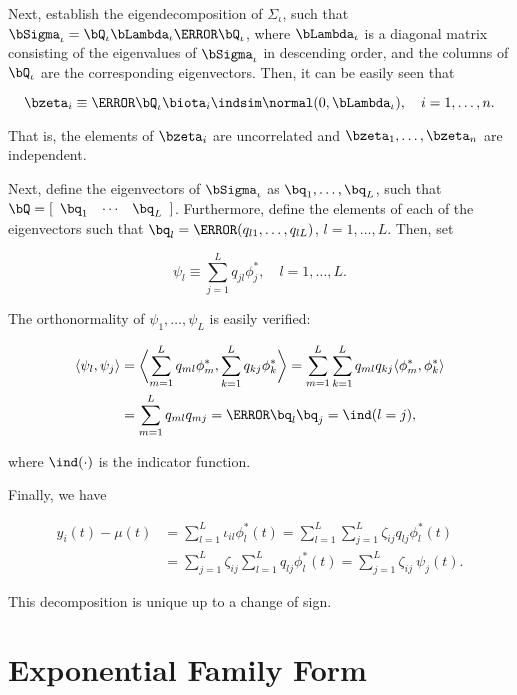 \documentclass[12pt]{article}
\theoremstyle{plain}
\theoremstyle{definition}
\theoremstyle{remark}
\begin{document}
\noindent Next, establish the eigendecomposition of $\Sigma_\iota$, such
that $\bSigma_\iota = \bQ_\iota \bLambda_\iota \T{\bQ_\iota}$, where $\bLambda_\iota$
is a diagonal matrix consisting of the eigenvalues of
$\bSigma_\iota$ in descending order, and the columns of $\bQ_\iota$
are the corresponding eigenvectors. Then, it can be easily seen that

\[
	\bzeta_i \equiv \T{\bQ_\iota} \biota_i \indsim \normal (0, \bLambda_\iota), \quad i = 1, \dots, n.
\]

\noindent That is, the elements of $\bzeta_i$ are uncorrelated and $\bzeta_1, \dots, \bzeta_n$ are independent.

Next, define the eigenvectors of $\bSigma_\iota$ as $\bq_1, \dots, \bq_L$, such that
$\bQ = [ \begin{array}{ccc} \bq_1 & \cdots & \bq_L \end{array} ]$.
Furthermore, define the elements of each of
the eigenvectors such that $\bq_l = \T{( q_{l1}, \dots, q_{lL} )}$, $l = 1, \dots, L$. Then, set

\[
	\psi_l \equiv \sum_{j=1}^L q_{jl} \phi^*_j, \quad l = 1, \dots, L.
\]

\noindent The orthonormality of $\psi_1, \dots, \psi_L$ is easily verified:

\begin{align*}
	\langle \psi_l , \psi_j \rangle
		&= \biggl\langle \sum_{m=1}^L q_{ml} \phi^*_m , \sum_{k=1}^L q_{kj} \phi^*_k \biggr\rangle
		= \sum_{m=1}^L \sum_{k=1}^L q_{ml} q_{kj} \langle \phi^*_m , \phi^*_k \rangle \\
		&= \sum_{m=1}^L q_{ml} q_{mj}
		= \T{\bq_l} \bq_j
		= \ind (l = j),
\end{align*}

\noindent where $\ind (\cdot)$ is the indicator function.

Finally, we have

\begin{align*}
	y_i (t) - \mu (t)
		&= \sum_{l=1}^L \iota_{il} \phi^*_l (t)
		= \sum_{l=1}^L \sum_{j=1}^L \zeta_{ij} q_{lj} \phi^*_l (t) \\
		&= \sum_{j=1}^L \zeta_{ij} \sum_{l=1}^L q_{lj} \phi^*_l (t)
		= \sum_{j=1}^L \zeta_{ij} \ \psi_j (t).
\end{align*}

\noindent This decomposition is unique up to a change of sign.


\section{Exponential Family Form}
\label{app:exp_fam_form}
\end{document}
